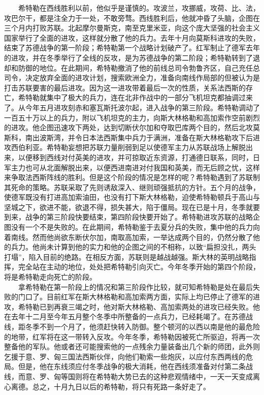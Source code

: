 \documentclass[cn,11pt,chinese]{elegantbook}
\begin{document}
　　希特勒在西线胜利以前，他似乎是谨慎的。攻波兰，攻挪威，攻荷、比、法，攻巴尔干，都是注全力于一处，不敢旁骛。西线胜利后，他就冲昏了头脑，企图在三个月内打败苏联。北起摩尔曼斯克，南至克里米亚，向这个庞大坚强的社会主义国家举行了全面的进攻，这样就分散了他的兵力。去年十月向莫斯科进攻的失败，结束了苏德战争的第一阶段；希特勒第一个战略计划破产了。红军制止了德军去年的进攻，并在冬季举行了全线的反攻，是为苏德战争的第二阶段；希特勒转到了退却和防御的地位。在此期间，希特勒撤消了他的前线总司令勃鲁齐区，自己充任总司令，决定放弃全面的进攻计划，搜索欧洲全力，准备向南线作局部的但被认为是打击苏联要害的最后进攻。因为这一进攻带着最后一次的性质，关系法西斯的存亡，希特勒就集中了极大的兵力，连在北非作战中的一部分飞机坦克都抽调过来了。从今年五月进攻刻赤和塞瓦斯托波尔起，进入战争的第三阶段。希特勒调动了一百五十万以上的兵力，附以飞机坦克的主力，向斯大林格勒和高加索作空前剧烈的进攻。他企图迅速攻下两处，达到切断伏尔加和夺取巴库两个目的，然后北攻莫斯科，南出波斯湾，并令日本法西斯集中兵力于满洲，准备在斯大林格勒攻下后进攻西伯利亚。希特勒妄想把苏联力量削弱到足以使德军主力从苏联战场上解脱出来，以便移到西线对付英美的进攻，并可掠取近东资源，打通德日联系，同时，日军主力也可从北面解脱出来，以便西进南进对付我国和英美，而无后顾之忧，这样来争取法西斯阵线的胜利。但是这个阶段的情况是怎样的呢？希特勒遇到了苏联制其死命的策略。苏联采取了先则诱敌深入、继则顽强抵抗的方针。五个月的战争，使德军既没有打进高加索油田，也没有打下斯大林格勒，迫使希特勒顿兵于高山与坚城之下，欲进不能，欲退不得，损失甚大，陷于僵局。现在已是十月，冬季就要到来，战争的第三阶段快要结束，第四阶段快要开始了。希特勒进攻苏联的战略企图没有一个不是失败的。在此期间，希特勒鉴于去夏分兵的失败，集中他的兵力向着南线。然而他尚欲东断伏尔加，南取高加索，一举达成两个目的，仍然分散了他的兵力。他尚未计算到他的实力和他的企图之间的不相称，以致“扁担没扎，两头打塌”，陷入目前的绝路。在相反方面，苏联则是越战越强。斯大林的英明战略指挥，完全站在主动的地位，处处把希特勒引向灭亡。今年冬季开始的第四个阶段，将是希特勒走向死亡的阶段。\\
　　拿希特勒在第一阶段上的情况和第三阶段作比较，就可知希特勒是处在最后失败的门口了。目前红军在斯大林格勒和高加索两方面，实际上均已停止了德军的进攻，希特勒已到再衰三竭之时，他对斯大林格勒、高加索两处的进攻已经失败。他在去年十二月至今年五月整个冬季中所整备的一点兵力，已经耗竭了。在苏德战线，距冬季不到一个月了，他须赶快转入防御。整个顿河的以西以南是他的最危险的地带，红军将在这一带转入反攻。今年冬季，希特勒因被死亡所驱迫，将再一次整备他的军队。他或者还可能搜索他的一点残余力量装备出几个新的师团，此外则乞援于意、罗、匈三国法西斯伙伴，向他们勒索一些炮灰，以应付东西两线的危局。但是，他在东线须应付冬季战争的极大消耗，他在西线须准备对付第二条战线，而意、罗、匈等国则将在希特勒大势已去的这种悲观情绪中，一天一天变成离心离德。总之，十月九日以后的希特勒，将只有死路一条好走了。\\
\end{document}
